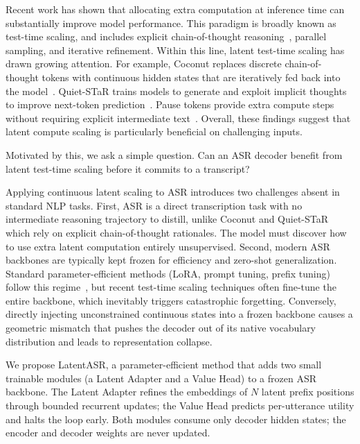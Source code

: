 \documentclass[a4paper]{article}
\newcommand{\method}{LatentASR}
\begin{document}
Recent work has shown that allocating extra computation at inference time can substantially improve model performance. This paradigm is broadly known as test-time scaling, and includes explicit chain-of-thought reasoning~\cite{wei2022chain}, parallel sampling, and iterative refinement. Within this line, latent test-time scaling has drawn growing attention. For example, Coconut replaces discrete chain-of-thought tokens with continuous hidden states that are iteratively fed back into the model~\cite{hao2024training}. Quiet-STaR trains models to generate and exploit implicit thoughts to improve next-token prediction~\cite{zelikman2024quiet}. Pause tokens provide extra compute steps without requiring explicit intermediate text~\cite{goyal2024think}. Overall, these findings suggest that latent compute scaling is particularly beneficial on challenging inputs.

Motivated by this, we ask a simple question. Can an ASR decoder benefit from latent test-time scaling before it commits to a transcript?

Applying continuous latent scaling to ASR introduces two challenges absent in standard NLP tasks. First, ASR is a direct transcription task with no intermediate reasoning trajectory to distill, unlike Coconut and Quiet-STaR which rely on explicit chain-of-thought rationales. The model must discover how to use extra latent computation entirely unsupervised. Second, modern ASR backbones are typically kept frozen for efficiency and zero-shot generalization. Standard parameter-efficient methods (LoRA, prompt tuning, prefix tuning) follow this regime~\cite{hu2022lora,lester2021power,li2021prefix}, but recent test-time scaling techniques often fine-tune the entire backbone, which inevitably triggers catastrophic forgetting. Conversely, directly injecting unconstrained continuous states into a frozen backbone causes a geometric mismatch that pushes the decoder out of its native vocabulary distribution and leads to representation collapse.

We propose \method{}, a parameter-efficient method that adds two small trainable modules (a Latent Adapter and a Value Head) to a frozen ASR backbone. The Latent Adapter refines the embeddings of $N$ latent prefix positions through bounded recurrent updates; the Value Head predicts per-utterance utility and halts the loop early. Both modules consume only decoder hidden states; the encoder and decoder weights are never updated.
\end{document}
